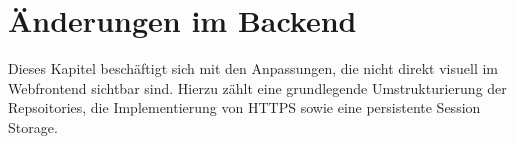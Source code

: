 \section{Änderungen im Backend}\label{sec:aenderungen-im-backend}
Dieses Kapitel beschäftigt sich mit den Anpassungen, die nicht direkt visuell im Webfrontend sichtbar sind.
Hierzu zählt eine grundlegende Umstrukturierung der Repsoitories, die Implementierung von HTTPS sowie eine persistente Session Storage.


\newpage

\newpage

